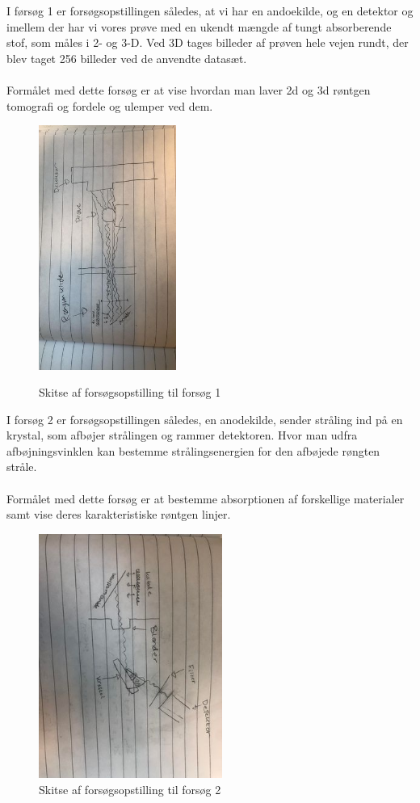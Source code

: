 \documentclass[a4paper,twoside]{article}
\begin{document}
I førsøg 1 er forsøgsopstillingen således, at vi har en andoekilde, og en detektor og imellem der har vi vores prøve med en ukendt mængde af tungt absorberende stof, som måles i 2- og 3-D. Ved 3D tages billeder af prøven hele vejen rundt, der blev taget 256 billeder ved de anvendte datasæt. \\\\
Formålet med dette forsøg er at vise hvordan man laver 2d og 3d røntgen tomografi og fordele og ulemper ved dem. 
\begin{figure}[H]
\begin{centering}
\includegraphics[height=8cm,angle=-90]{Forsøg 1.jpg}
\hspace{1cm}
\caption{\label{cap:2ien}}{Skitse af forsøgsopstilling til forsøg 1}
\par\end{centering}
\end{figure}
I forsøg 2 er forsøgsopstillingen således, en anodekilde, sender stråling ind på en krystal, som afbøjer strålingen og rammer detektoren. Hvor man udfra afbøjningsvinklen kan bestemme strålingsenergien for den afbøjede røngten stråle. \\\\
Formålet med dette forsøg er at bestemme absorptionen af forskellige materialer samt vise deres karakteristiske røntgen linjer. 
\begin{figure}[H]
\begin{centering}
\includegraphics[height=8cm, angle=90]{Forsøg 2.jpg}
\hspace{1cm}
\caption{\label{ap:2ien}{Skitse af forsøgsopstilling til forsøg 2}}
\par\end{centering}
\end{figure}
\end{document}
